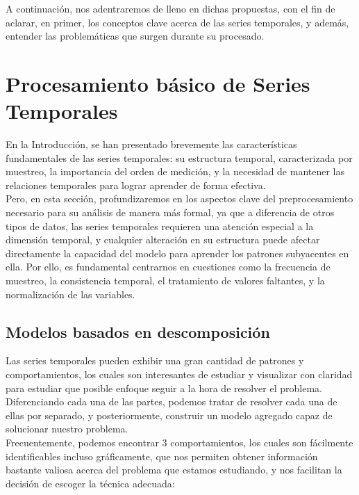 A continuación, nos adentraremos de lleno en dichas propuestas, con el fin de aclarar, en primer, los conceptos clave acerca de las series temporales, y además, entender las problemáticas que surgen durante su procesado.


\section{Procesamiento básico de Series Temporales}

En la Introducción, se han presentado brevemente las características fundamentales de las series temporales: su estructura temporal, caracterizada por muestreo, la importancia del orden de medición, y la necesidad de mantener las relaciones temporales para lograr aprender de forma efectiva.\\

Pero, en esta sección, profundizaremos en los aspectos clave del preprocesamiento necesario para su análisis de manera más formal, ya que a diferencia de otros tipos de datos, las series temporales requieren una atención especial a la dimensión temporal, y cualquier alteración en su estructura puede afectar directamente la capacidad del modelo para aprender los patrones subyacentes en ella. Por ello, es fundamental centrarnos en cuestiones como la frecuencia de muestreo, la consistencia temporal, el tratamiento de valores faltantes, y la normalización de las variables.

\subsection{Modelos basados en descomposición}

Las series temporales pueden exhibir una gran cantidad de patrones y comportamientos, los cuales son interesantes de estudiar y visualizar con claridad para estudiar que posible enfoque seguir a la hora de resolver el problema. Diferenciando cada una de las partes, podemos tratar de resolver cada una de ellas por separado, y posteriormente, construir un modelo agregado capaz de solucionar nuestro problema.\\

Frecuentemente, podemos encontrar 3 comportamientos, los cuales son fácilmente identificables incluso gráficamente, que nos permiten obtener información bastante valiosa acerca del problema que estamos estudiando, y nos facilitan la decisión de escoger la técnica adecuada:

